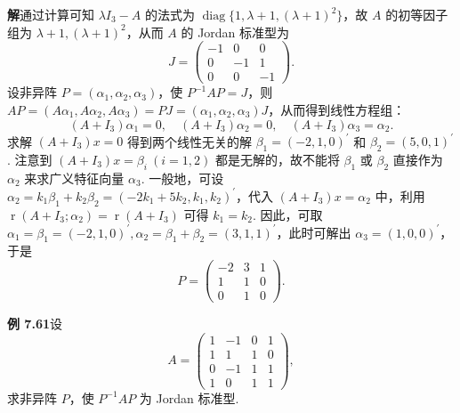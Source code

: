 \documentclass[UTF8, 12pt, fontset=fandol, oneside]{ctexart}
\begin{document}
\noindent\textbf{解}\quad 通过计算可知 $\lambda I_3-A$ 的法式为 $\operatorname{diag}\{1,\lambda+1,(\lambda+1)^2\}$，故 $A$ 的初等因子组为 $\lambda+1,(\lambda+1)^2$，从而 $A$ 的 Jordan 标准型为
\[
J=\left(\begin{array}{ccc}
-1&0&0\\
0&-1&1\\
0&0&-1
\end{array}\right).
\]
设非异阵 $P=(\alpha_1,\alpha_2,\alpha_3)$，使 $P^{-1}AP=J$，则 $AP=(A\alpha_1,A\alpha_2,A\alpha_3)=PJ=(\alpha_1,\alpha_2,\alpha_3)J$，从而得到线性方程组：
\[
(A+I_3)\alpha_1=0,\quad (A+I_3)\alpha_2=0,\quad (A+I_3)\alpha_3=\alpha_2.
\]
求解 $(A+I_3)x=0$ 得到两个线性无关的解 $\beta_1=(-2,1,0)^{\prime}$ 和 $\beta_2=(5,0,1)^{\prime}$. 注意到 $(A+I_3)x=\beta_i\ (i=1,2)$ 都是无解的，故不能将 $\beta_1$ 或 $\beta_2$ 直接作为 $\alpha_2$ 来求广义特征向量 $\alpha_3$. 一般地，可设 $\alpha_2=k_1\beta_1+k_2\beta_2=(-2k_1+5k_2,k_1,k_2)^{\prime}$，代入 $(A+I_3)x=\alpha_2$ 中，利用 $\operatorname{r}(A+I_3;\alpha_2)=\operatorname{r}(A+I_3)$ 可得 $k_1=k_2$. 因此，可取 $\alpha_1=\beta_1=(-2,1,0)^{\prime},\alpha_2=\beta_1+\beta_2=(3,1,1)^{\prime}$，此时可解出 $\alpha_3=(1,0,0)^{\prime}$，于是
\[
P=\left(\begin{array}{ccc}
-2&3&1\\
1&1&0\\
0&1&0
\end{array}\right).
\]

\noindent\textbf{例 7.61}\quad 设
\[
A=\left(\begin{array}{rrrr}
1&-1&0&1\\
1&1&1&0\\
0&-1&1&1\\
1&0&1&1
\end{array}\right),
\]
求非异阵 $P$，使 $P^{-1}AP$ 为 Jordan 标准型.
\end{document}
